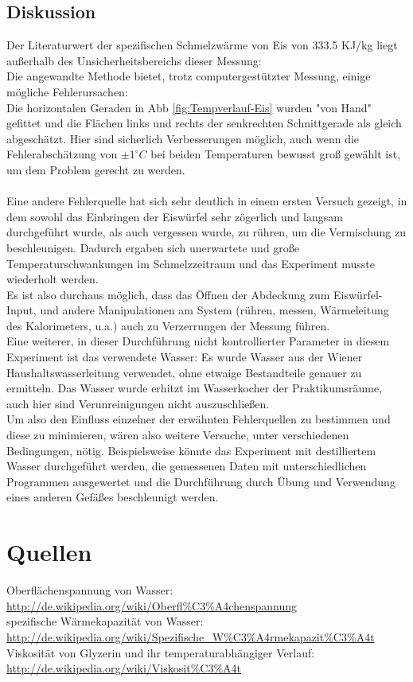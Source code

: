 \documentclass[12pt,a4paper]{article}
\begin{document}
\begin{multicols}{2}
\subsection{Diskussion}
Der Literaturwert der spezifischen Schmelzwärme von Eis von 333.5 KJ/kg liegt außerhalb des Unsicherheitsbereichs dieser Messung:\\
Die angewandte Methode bietet, trotz computergestützter Messung, einige mögliche Fehlerursachen:\\
Die horizontalen Geraden in Abb \ref{fig:Tempverlauf-Eis} wurden "von Hand" gefittet und die Flächen links und rechts der senkrechten Schnittgerade als gleich abgeschätzt. Hier sind sicherlich Verbesserungen möglich, auch wenn die Fehlerabschätzung von $\pm 1 ^\circ C$ bei beiden Temperaturen bewusst groß gewählt ist, um dem Problem gerecht zu werden.\\
\\
Eine andere Fehlerquelle hat sich sehr deutlich in einem ersten Versuch gezeigt, in dem sowohl das Einbringen der Eiswürfel sehr zögerlich und langsam durchgeführt wurde, als auch vergessen wurde, zu rühren, um die Vermischung zu beschleunigen. Dadurch ergaben sich unerwartete und große Temperaturschwankungen im Schmelzzeitraum und das Experiment musste wiederholt werden.\\
Es ist also durchaus möglich, dass das Öffnen der Abdeckung zum Eiswürfel-Input, und andere Manipulationen am System (rühren, messen, Wärmeleitung des Kalorimeters, u.a.) auch zu Verzerrungen der Messung führen.\\
Eine weiterer, in dieser Durchführung nicht kontrollierter Parameter in diesem Experiment ist das verwendete Wasser: Es wurde Wasser aus der Wiener Haushaltswasserleitung verwendet, ohne etwaige Bestandteile genauer zu ermitteln. Das Wasser wurde erhitzt im Wasserkocher der Praktikumsräume, auch hier sind Verunreinigungen nicht auszuschließen.\\
Um also den Einfluss einzelner der erwähnten Fehlerquellen zu bestimmen und diese zu minimieren, wären also weitere Versuche, unter verschiedenen Bedingungen, nötig. Beispielsweise könnte das Experiment mit destilliertem Wasser durchgeführt werden, die gemessenen Daten mit unterschiedlichen Programmen ausgewertet und die Durchführung durch Übung und Verwendung eines anderen Gefäßes beschleunigt werden.


\section{Quellen}
\noindent Oberflächenspannung von Wasser:\\
\url{http://de.wikipedia.org/wiki/Oberfl%C3%A4chenspannung}\\
\noindent spezifische Wärmekapazität von Wasser:\\
\url{http://de.wikipedia.org/wiki/Spezifische_W%C3%A4rmekapazit%C3%A4t}
\noindent Viskosität von Glyzerin und ihr temperaturabhängiger Verlauf:\\
\url{http://de.wikipedia.org/wiki/Viskosit%C3%A4t}

\end{multicols}
\end{document}
